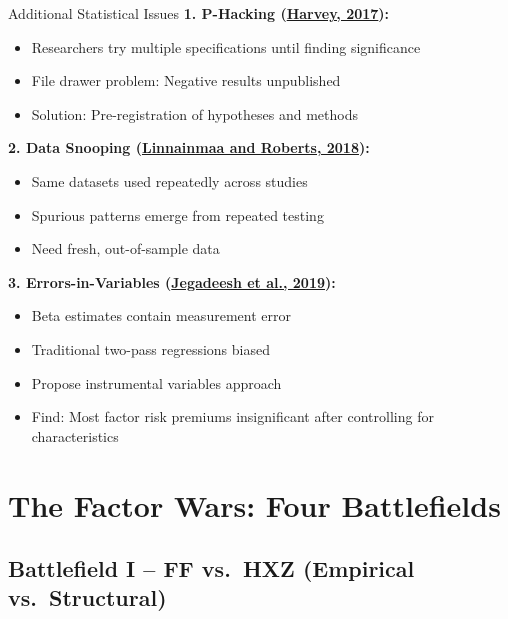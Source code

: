 \documentclass{beamer}
\begin{document}
\begin{frame}{Additional Statistical Issues}
    \textbf{1. P-Hacking (\textcolor{blue}{\href{https://doi.org/10.1111/jofi.12530}{Harvey, 2017}}):}
    \begin{itemize}
        \item Researchers try multiple specifications until finding significance
        \item File drawer problem: Negative results unpublished
        \item Solution: Pre-registration of hypotheses and methods
    \end{itemize}
    
    
    \textbf{2. Data Snooping (\textcolor{blue}{\href{https://academic.oup.com/rfs/article/31/7/2606/4977829}{Linnainmaa and Roberts, 2018}}):}
    \begin{itemize}
        \item Same datasets used repeatedly across studies
        \item Spurious patterns emerge from repeated testing
        \item Need fresh, out-of-sample data
    \end{itemize}
    
    
    \textbf{3. Errors-in-Variables (\textcolor{blue}{\href{https://doi.org/10.1016/j.jfineco.2019.02.010}{Jegadeesh et al., 2019}}):}
    \begin{itemize}
        \item Beta estimates contain measurement error
        \item Traditional two-pass regressions biased
        \item Propose instrumental variables approach
        \item Find: Most factor risk premiums insignificant after controlling for characteristics
    \end{itemize}
\end{frame}

\section{The Factor Wars: Four Battlefields}

\subsection{Battlefield I -- FF vs.\ HXZ (Empirical vs.\ Structural)}
\end{document}
